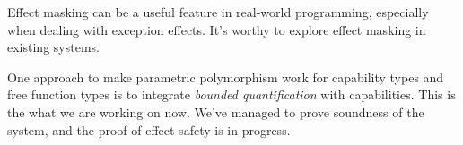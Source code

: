 Effect masking can be a useful feature in real-world programming,
especially when dealing with exception effects. It's worthy to explore
effect masking in existing systems.

One approach to make parametric polymorphism work for capability types
and free function types is to integrate \emph{bounded quantification}
with capabilities. This is the what we are working on now. We've
managed to prove soundness of the system, and the proof of effect
safety is in progress.


